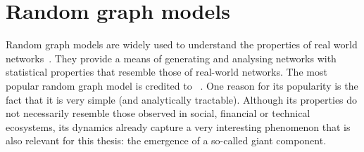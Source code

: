 \documentclass[12pt,beltcrest]{ociamthesis} %
\begin{document}



\section{Random graph models} %
\label{sec:random_graph_models}

Random graph models are widely used to understand the properties of real world networks~\cite{newman2002random}.
They provide a means of generating and analysing networks with statistical properties that resemble those of real-world networks.
The most popular random graph model is credited to %
~\cite{erdos1959random}.
One reason for its popularity is the fact that it is very simple (and analytically tractable).
Although its properties do not necessarily resemble those observed in social, financial or technical ecosystems, its dynamics already capture a very interesting phenomenon that is also relevant for this thesis: the emergence of a so-called giant component.
\end{document}
